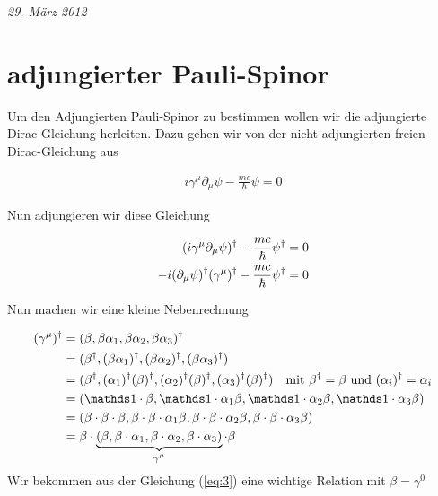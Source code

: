
\usepackage{amsmath} 





\textit{29. März 2012}


\section*{adjungierter Pauli-Spinor}


Um den Adjungierten Pauli-Spinor zu bestimmen wollen wir die adjungierte Dirac-Gleichung herleiten. Dazu gehen wir von der nicht adjungierten freien Dirac-Gleichung aus

\begin{align}
  \label{eq:1}
  i\gamma^\mu\partial_\mu\psi - \frac{mc}{\hbar}\psi = 0
\end{align}

Nun adjungieren wir diese Gleichung

\begin{align}
  \label{eq:2}
   (i\gamma^\mu\partial_\mu\psi)^\dagger - \frac{mc}{\hbar}\psi^\dagger &= 0 \notag\\
 -i(\partial_\mu\psi)^\dagger(\gamma^\mu)^\dagger - \frac{mc}{\hbar}\psi^\dagger &= 0
\end{align}

Nun machen wir eine kleine Nebenrechnung

\begin{align}
  \label{eq:3}
  (\gamma^\mu)^\dagger &= (\beta,\beta\alpha_1,\beta\alpha_2,\beta\alpha_3)^\dagger \notag \\
&= (\beta^\dagger,(\beta\alpha_1)^\dagger,(\beta\alpha_2)^\dagger,(\beta\alpha_3)^\dagger) \notag \\
&= (\beta^\dagger,(\alpha_1)^\dagger(\beta)^\dagger,(\alpha_2)^\dagger(\beta)^\dagger,(\alpha_3)^\dagger(\beta)^\dagger)\quad \text{mit }\beta^\dagger=\beta \text{ und }(\alpha_i)^\dagger=\alpha_i \notag \\
&= (\mathds 1\cdot \beta,\mathds 1\cdot \alpha_1\beta,\mathds 1\cdot\alpha_2\beta,\mathds 1\cdot\alpha_3\beta)   \notag \\
&= (\beta\cdot\beta\cdot \beta,\beta\cdot\beta\cdot \alpha_1\beta,\beta\cdot\beta\cdot\alpha_2\beta,\beta\cdot\beta\cdot\alpha_3\beta)   \notag \\
&= \beta\cdot\underbr{(\beta,\beta\cdot \alpha_1,\beta\cdot\alpha_2,\beta\cdot\alpha_3)}_{\gamma^\mu} \cdot\beta 
\end{align}
Wir bekommen aus der Gleichung (\ref{eq:3}) eine wichtige Relation mit \(\beta=\gamma^0\)

